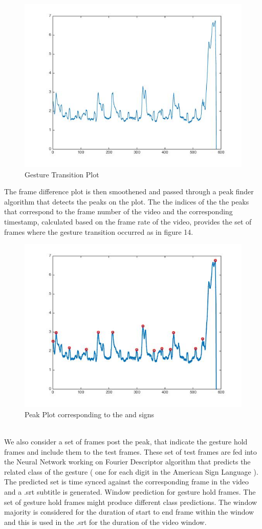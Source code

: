 \documentclass{acm} %
\begin{document}
\begin{figure}[h]
\centering
\includegraphics[width=3 in]{peaks1}
\caption{Gesture Transition Plot}
\label{fig:fig15}
\end{figure}


The frame difference plot is then smoothened and passed through a peak finder algorithm that detects the peaks on the plot. The the indices of the the peaks that correspond to the frame number of the video and the corresponding timestamp, calculated based on the frame rate of the video, provides the set of frames where the gesture transition occurred as in figure 14.

\begin{figure}[h]
\centering
\includegraphics[width=3 in]{peaks2}
\caption{Peak Plot corresponding to the and signs}
\label{fig:fig16}
\end{figure}
\\
We also consider a set of frames post the peak, that indicate the gesture hold frames and include them to the test frames.  These set of test frames are fed into the Neural Network working on Fourier Descriptor algorithm that predicts the related class of the gesture ( one for each digit in the American Sign Language ).  The predicted set is time synced against the corresponding frame in the video and a .srt subtitle is generated. Window prediction for gesture hold frames. The set of gesture hold frames might produce different class predictions. The window majority is considered for the duration of start to end frame within the window and this is used in the .srt for the duration of the video window. 
\end{document}
